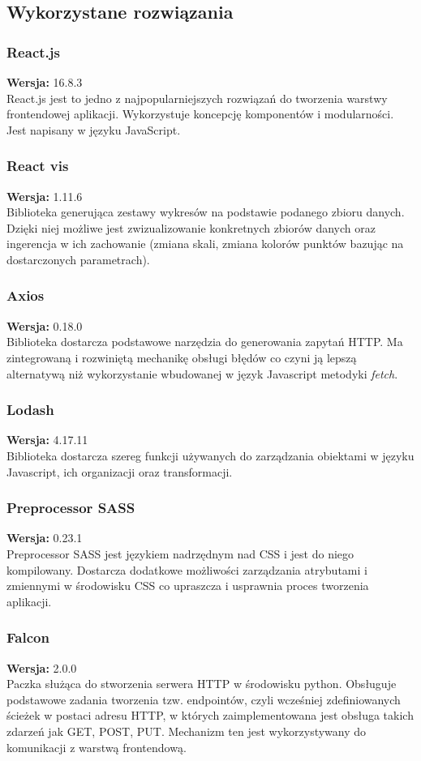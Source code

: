 \documentclass[eng,printmode]{mgr}
\begin{document}
\subsection{Wykorzystane rozwiązania}
\subsubsection{React.js}
\small \textbf{Wersja:} 16.8.3\\
React.js \cite{react} jest to jedno z najpopularniejszych rozwiązań do tworzenia warstwy frontendowej aplikacji. Wykorzystuje koncepcję komponentów i modularności. Jest napisany w języku JavaScript.
\subsubsection{React vis}
\small \textbf{Wersja:} 1.11.6\\
Biblioteka generująca zestawy wykresów na podstawie podanego zbioru danych. Dzięki niej możliwe jest zwizualizowanie konkretnych zbiorów danych oraz ingerencja w ich zachowanie (zmiana skali, zmiana kolorów punktów bazując na dostarczonych parametrach).
\subsubsection{Axios}
\small \textbf{Wersja:} 0.18.0\\
Biblioteka dostarcza podstawowe narzędzia do generowania zapytań HTTP. Ma zintegrowaną i rozwiniętą mechanikę obsługi błędów co czyni ją lepszą alternatywą niż wykorzystanie wbudowanej  w język Javascript metodyki \textit{fetch}.
\subsubsection{Lodash}
\small \textbf{Wersja:} 4.17.11\\
Biblioteka dostarcza szereg funkcji używanych do zarządzania obiektami w języku Javascript, ich organizacji oraz transformacji.
\subsubsection{Preprocessor SASS}
\small \textbf{Wersja:} 0.23.1\\
Preprocessor SASS jest językiem nadrzędnym nad CSS i jest do niego kompilowany. Dostarcza dodatkowe możliwości zarządzania atrybutami i zmiennymi w środowisku CSS co upraszcza i usprawnia proces tworzenia aplikacji.
\subsubsection{Falcon}
\small \textbf{Wersja:} 2.0.0\\
Paczka służąca do stworzenia serwera HTTP w środowisku python. Obsługuje podstawowe zadania tworzenia tzw. endpointów, czyli wcześniej zdefiniowanych ścieżek w postaci adresu HTTP, w których zaimplementowana jest obsługa takich zdarzeń jak GET, POST, PUT. Mechanizm ten jest wykorzystywany do komunikacji z warstwą frontendową.
\end{document}
